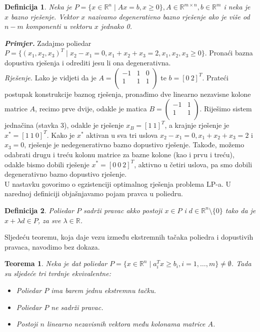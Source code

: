 \documentclass[a4paper, utf8, 11pt, colorlinks]{book}
\newtheorem{definition}{Definicija}
\newtheorem{thm}{Teorema}
\begin{document}
\begin{definition}
      Neka je $P = \{ x \in \mathbb{R}^n \mid A x = b, x \geq 0\}, A \in \mathbb{R}^{m \times n}, b \in \mathbb{R}^m$    i neka je $x$ bazno rješenje. Vektor $x$ nazivamo degenerativno bazno rješenje ako je više od $n-m$ komponenti u vektoru $x$   jednako 0.
\end{definition}
\emph{\textbf{Primjer.}} Zadajmo poliedar $P= \{ (x_1,x_2,x_3)^T \mid x_2 - x_1 = 0, x_1 + x_2 +   x_3 = 2, x_1,x_2,x_3 \geq 0 \}$.  Pronaći bazna dopustiva rješenja i odrediti jesu li ona degenerativna. \\

\emph{Rješenje.} Lako je vidjeti da je  
$A=\left (\begin{array}{ccc}
   -1  &  1 & 0  \\
   1  &  1 & 1 \\
\end{array} \right )$ te $b = [0\ 2]^T$. Prateći postupak konstrukcije baznog rješenja, pronađimo dve linearno nezavisne kolone matrice $A$, recimo prve dvije, odakle je matica $B=\left (\begin{array}{cc}
   -1  & 1    \\
   1  &  1   \\
\end{array} \right ) .$ Riješimo sistem jednačina (stavka 3), odakle je rješenje $x_B = [1\ 1]^T$, a krajnje rješenje je $x^* = [1\ 1\ 0]^T$. Kako je 
$x^*$ aktivan u sva tri uslova $x_2 - x_1 = 0, x_1 + x_2 +  x_3 = 2$ i $x_3 = 0$, rješenje je nedegenerativno bazno dopustivo rješenje.  Takođe, možemo odabrati drugu i treću kolonu matrice za bazne kolone (kao i prvu i treću), odakle bismo dobili rješenje $x^* = [0\ 0\ 2]^T$, aktivno u četiri uslova, pa smo dobili degenerativno bazno dopustivo rješenje. \\


U nastavku govorimo o egzistenciji optimalnog rješenja problema LP-a. U narednoj definiciji objašnjavamo pojam pravca u poliedru.

\begin{definition}
      Poliedar $P$ sadrži pravac akko postoji $x \in P$ i $d \in \mathbb{R}^n \setminus \{0\}$ tako da je $x + \lambda d \in P$, za sve $\lambda \in \mathbb{R}$. 
\end{definition}

Sljedeću teoremu, koja daje vezu između ekstremnih tačaka poliedra i dopustivih pravaca, navodimo bez dokaza.

\begin{thm}
   Neka je dat poliedar $P=\{ x \in \mathbb{R}^n  \mid a_i^T x \geq b_i, i=1,\ldots,m\} \neq \emptyset$. Tada su sljedeće tri tvrdnje ekvivalentne:
   \begin{itemize}
       \item  Poliedar $P$ ima barem jednu ekstremnu tačku.
       \item Poliedar $P$ ne sadrži pravac.
       \item Postoji $n$ linearno nezavisnih vektora  među kolonama matrice $A$. %
   \end{itemize}
\end{thm}
\end{document}
